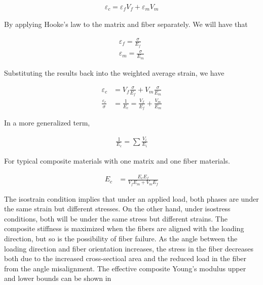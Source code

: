 \documentclass[
10pt,
a4paper,
openany,
svgnames,
]{book}
\begin{document}
\begin{align*}
  \varepsilon_c = \varepsilon_{f} V_{f} + \varepsilon_{m} V_{m}
\end{align*}

By applying Hooke's law to the matrix and fiber separately. We will have that

\begin{align*}
  \varepsilon_f = \frac{\sigma}{E_f} \\
  \varepsilon_m = \frac{\sigma}{E_m}
\end{align*}

Substituting the results back into the weighted average strain, we have

\begin{align*}
  \varepsilon_c &= V_f \frac{\sigma}{E_f} + V_m \frac{\sigma}{E_m} \nonumber \\
  \frac{\varepsilon_c}{\sigma} &= \frac{1}{E_c} =  \frac{V_f}{E_f} + \frac{V_m}{E_m} \nonumber 
\end{align*}

In a more generalized term,

\begin{align}
  \frac{1}{E_c} = \sum \frac{V_i}{E_i}
\end{align}

For typical composite materials with one matrix and one fiber materials. 

\begin{align}
  E_c &= \frac{E_cE_f}{V_fE_m + V_mE_f}
\end{align}

The isostrain condition implies that under an applied load, both phases are under the same strain but different stresses. On the other hand, under isostress conditions, both will be under the same stress but different strains. The composite stiffness is maximized when the fibers are aligned with the loading direction, but so is the possibility of fiber failure. As the angle between the loading direction and fiber orientation increases, the stress in the fiber decreases both due to the increased cross-sectioal area and the reduced load in the fiber from the angle misalignment. The effective composite Young's modulus upper and lower bounds can be shown in 
\end{document}
